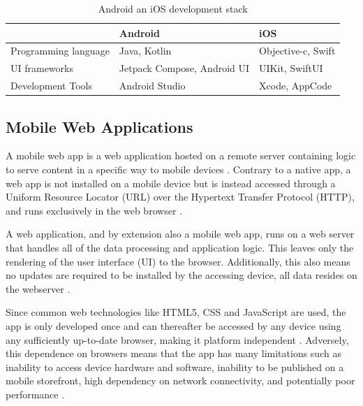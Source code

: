 \documentclass[a4paper,12pt]{article}
\begin{document}
\begin{table}[h]
\centering
{}
\begin{tabular}{|l|l|l|}
\hline
\rowcolor[HTML]{656565}
\multicolumn{1}{|c|}{\cellcolor[HTML]{656565}} & {\color[HTML]{FFFFFF} Android} & {\color[HTML]{FFFFFF} iOS} \\ \hline
Programming language & Java, Kotlin & Objective-c, Swift \\
UI frameworks & Jetpack Compose, Android UI & UIKit, SwiftUI \\
Development Tools & Android Studio & Xcode, AppCode \\ \hline
\end{tabular}
\caption{Android an iOS development stack \cite{mobile_tech_stacks}}
\label{tab:devstack}
\end{table}

\subsection{Mobile Web Applications}
\label{Theory_mobileWebApps}
A mobile web app is a web application hosted on a remote server containing logic to serve content in a specific way to mobile devices \cite{crossplatform_2012, mobile_web_apps_2013}. Contrary to a native app, a web app is not installed on a mobile device but is instead accessed through a Uniform Resource Locator (URL) over the Hypertext Transfer Protocol (HTTP), and runs exclusively in the web browser \cite{crossplatform_taxonomy, crossplatform_2012}.

A web application, and by extension also a mobile web app, runs on a web server that handles all of the data processing and application logic. This leaves only the rendering of the user interface (UI) to the browser. Additionally, this also means no updates are required to be installed by the accessing device, all data resides on the webserver \cite{crossplatform_taxonomy, crossplatform_2012}.

Since common web technologies like HTML5, CSS and JavaScript are used, the app is only developed once and can thereafter be accessed by any device using any sufficiently up-to-date browser, making it platform independent \cite{crossplatform_taxonomy}. Adversely, this dependence on browsers means that the app has many limitations such as  inability to access device hardware and software, inability to be published on a mobile storefront, high dependency on network connectivity, and potentially poor performance \cite{crossplatform_taxonomy, crossplatform_2012}.
\end{document}
